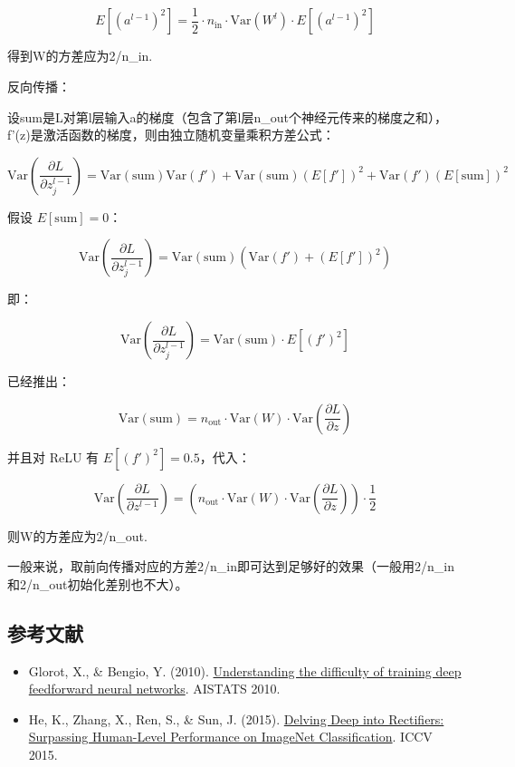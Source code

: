 \[
E[(a^{l-1})^2]
=\frac{1}{2}\cdot n_{\mathrm{in}}\cdot \mathrm{Var}(W^l)\cdot E[(a^{l-1})^2]
\]

得到W的方差应为2/n\_in.

反向传播：

设sum是L对第l层输入a的梯度（包含了第l层n\_out个神经元传来的梯度之和），f'(z)是激活函数的梯度，则由独立随机变量乘积方差公式：

\[
\mathrm{Var}\left(\frac{\partial L}{\partial z_j^{l-1}}\right)
=\mathrm{Var}(\mathrm{sum})\mathrm{Var}(f')
+\mathrm{Var}(\mathrm{sum})(E[f'])^2
+\mathrm{Var}(f')(E[\mathrm{sum}])^2
\]

假设 \(E[\mathrm{sum}]=0\)：

\[
\mathrm{Var}\left(\frac{\partial L}{\partial z_j^{l-1}}\right)
=\mathrm{Var}(\mathrm{sum})\left(\mathrm{Var}(f')+(E[f'])^2\right)
\]

即：

\[
\mathrm{Var}\left(\frac{\partial L}{\partial z_j^{l-1}}\right)
=\mathrm{Var}(\mathrm{sum})\cdot E[(f')^2]
\]

已经推出：

\[
\mathrm{Var}(\mathrm{sum})
=n_{\mathrm{out}}\cdot\mathrm{Var}(W)\cdot
\mathrm{Var}\left(\frac{\partial L}{\partial z}\right)
\]

并且对 ReLU 有 \(E[(f')^2]=0.5\)，代入：

\[
\mathrm{Var}\left(\frac{\partial L}{\partial z^{l-1}}\right)
=\left(n_{\mathrm{out}}\cdot\mathrm{Var}(W)\cdot
\mathrm{Var}\left(\frac{\partial L}{\partial z}\right)\right)\cdot\frac{1}{2}
\]

则W的方差应为2/n\_out.

一般来说，取前向传播对应的方差2/n\_in即可达到足够好的效果（一般用2/n\_in和2/n\_out初始化差别也不大）。

\hypertarget{ux53c2ux8003ux6587ux732e-9}{%
\subsection{参考文献}\label{ux53c2ux8003ux6587ux732e-9}}

\vspace{0.25em}
\begin{itemize}
\tightlist
\item
  Glorot, X., \& Bengio, Y. (2010). \href{https://proceedings.mlr.press/v9/glorot10a.html}{Understanding the difficulty of training deep feedforward neural networks}. AISTATS 2010.
\item
  He, K., Zhang, X., Ren, S., \& Sun, J. (2015). \href{https://arxiv.org/abs/1502.01852}{Delving Deep into Rectifiers: Surpassing Human-Level Performance on ImageNet Classification}. ICCV 2015.
\end{itemize}

